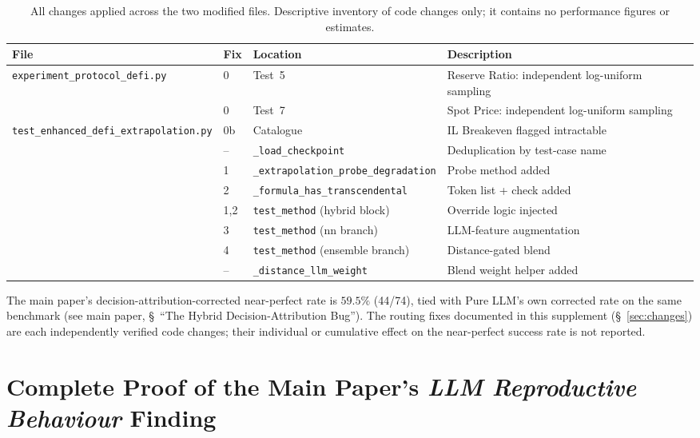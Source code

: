 \documentclass[twoside,11pt]{article}
\begin{document}
\begin{table}[h]
\centering
\caption{All changes applied across the two modified files.
  Descriptive inventory of code changes only; it contains no performance
  figures or estimates.}
\label{tab:changes}
\begin{tabular}{llll}
\toprule
\textbf{File} & \textbf{Fix} & \textbf{Location} & \textbf{Description} \\
\midrule
\texttt{experiment\_protocol\_defi.py}
  & 0  & Test~5  & Reserve Ratio: independent log-uniform sampling \\
  & 0  & Test~7  & Spot Price: independent log-uniform sampling \\
\midrule
\texttt{test\_enhanced\_defi\_extrapolation.py}
  & 0b & Catalogue     & IL Breakeven flagged intractable \\
  & -- & \texttt{\_load\_checkpoint} & Deduplication by test-case name \\
  & 1  & \texttt{\_extrapolation\_probe\_degradation} & Probe method added \\
  & 2  & \texttt{\_formula\_has\_transcendental} & Token list + check added \\
  & 1,2& \texttt{test\_method} (hybrid block) & Override logic injected \\
  & 3  & \texttt{test\_method} (nn branch)     & LLM-feature augmentation \\
  & 4  & \texttt{test\_method} (ensemble branch) & Distance-gated blend \\
  & -- & \texttt{\_distance\_llm\_weight} & Blend weight helper added \\
\bottomrule
\end{tabular}
\end{table}

\bigskip
\noindent The main paper's decision-attribution-corrected near-perfect rate is
$59.5\%$ (44/74), tied with Pure LLM's own corrected rate on the same benchmark (see main
paper, \S~``The Hybrid Decision-Attribution Bug''). The routing fixes documented in this
supplement (\S~\ref{sec:changes}) are each independently verified code changes; their
individual or cumulative effect on the near-perfect success rate is not reported.

\appendix

\section{Complete Proof of the Main Paper's \emph{LLM Reproductive Behaviour} Finding}
\label{app:proof}
\end{document}

